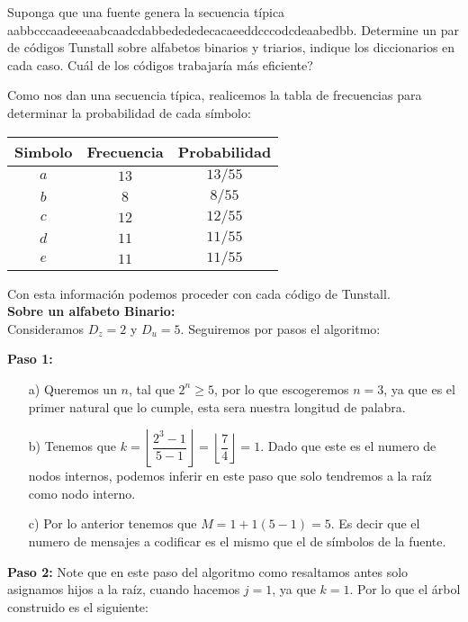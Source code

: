 
Suponga que una fuente genera la secuencia típica aabbcccaadeeeaabcaadcdabbedededecacaeeddcccodcdeaabedbb. Determine un par de códigos Tunstall sobre alfabetos binarios y triarios, indique los diccionarios en cada caso. Cuál de los códigos trabajaría más eficiente?
\begin{sols}
 Como nos dan una secuencia típica, realicemos la tabla de frecuencias para determinar la probabilidad de cada símbolo:
 \begin{center}
  \begin{tabular}{|c|c|c|}
  \hline
Simbolo & Frecuencia & Probabilidad \\
\hline
$a$ & $13$ & $13/55$\\
\hline
$b$ & $8$ & $8/55$\\
\hline
$c$ & $12$ & $12/55$\\
\hline
$d$ & $11$ & $11/55$\\
\hline
$e$ & $11$ & $11/55$\\
\hline
 \end{tabular}
 \end{center}
Con esta información podemos proceder con cada código de Tunstall.\\

\textbf{Sobre un alfabeto Binario:}\\

Consideramos $D_z=2$ y $D_u=5.$ Seguiremos por pasos el algoritmo:

\textbf{Paso 1:}
\begin{itemize}
    \item[a)] Queremos un $n$, tal que $2^n\geq 5$, por lo que escogeremos $n=3$, ya que es el primer natural que lo cumple, esta sera nuestra longitud de palabra.
    \item[b)] Tenemos que $k=\left\lfloor\dfrac{2^3-1}{5-1}\right\rfloor=\left\lfloor\dfrac{7}{4}\right\rfloor=1.$ Dado que este es el numero de nodos internos, podemos inferir en este paso que solo tendremos a la raíz como nodo interno.
    \item[c)] Por lo anterior tenemos que $M=1+1(5-1)=5.$ Es decir que el numero de mensajes a codificar es el mismo que el de símbolos de la fuente.
\end{itemize}
\textbf{Paso 2:}
 Note que en este paso del algoritmo como resaltamos antes solo asignamos hijos a la raíz, cuando hacemos $j=1$, ya que $k=1.$ Por  lo que el árbol construido es el siguiente:
 \begin{center}
       \begin{tikzpicture}


\end{tikzpicture}
\end{center}
\end{sols}
